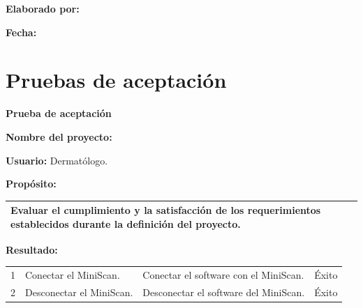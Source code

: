 {\begin{minipage}[t]{0.45\textwidth}
	\begin{flushleft}
		\textbf{Elaborado por:} \nombre
	\end{flushleft}
\end{minipage}
\begin{minipage}[t]{0.45\textwidth}
	\begin{flushright}
		\begin{center}
			\textbf{Fecha:} \fecha
		\end{center}
	\end{flushright}
\end{minipage}
\vfill
\newpage
\chapter{Pruebas de aceptaci\'{o}n}
\thispagestyle{fancy}
\begin{center}
	\textbf{Prueba de aceptaci\'{o}n}
\end{center}

\textbf{Nombre del proyecto:} \proyecto

\textbf{Usuario:} Dermat\'{o}logo.

\textbf{Prop\'{o}sito:}
\begin{table}[h]
	\centering
	\setlength{\extrarowheight}{\altocelda}
	\begin{tabularx}{\anchotabla}{|X|}
		\hline
		Evaluar el cumplimiento y la satisfacci\'{o}n de los requerimientos establecidos durante la definici\'{o}n del proyecto.\\ \hline
	\end{tabularx}
\end{table}

\textbf{Resultado:}
\begin{table}[h]
	\centering
	\setlength{\extrarowheight}{\altocelda}
	\begin{tabulary}{\anchotabla}{|c|L|J|c|}
		\hline
		\thead{\textbf{\small{\#}}} &  &  & \\ \hline

			1 & Conectar el \hbox{MiniScan}. & Conectar el software con el MiniScan. & \'{E}xito \\ \hline
		
			2 & Desconectar el \hbox{MiniScan}. & Desconectar el software del MiniScan. & \'{E}xito \\ \hline
			

\end{tabulary}
\end{table}}

